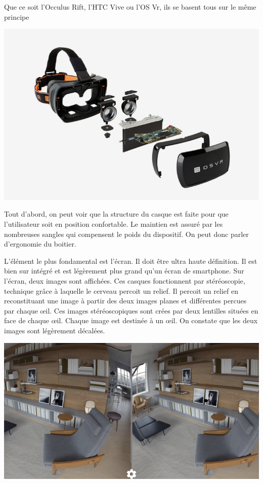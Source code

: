 \documentclass[12pt, a4paper]{report}
\begin{document}
Que ce soit l'Occulus Rift, l'HTC Vive ou l'OS Vr, ils se basent tous sur le même principe
\begin{center}
\includegraphics[scale=0.3]{eclate.jpg}
\end{center}

Tout d'abord, on peut voir que la structure du casque est faite pour que l'utilisateur soit en position confortable. Le maintien est assuré par les nombreuses sangles qui compensent le poids du dispositif. On peut donc parler d'ergonomie du boitier.

L'élément le plus fondamental est l'écran. Il doit être ultra haute définition. Il est bien sur intégré et est légèrement plus grand qu'un écran de smartphone. Sur l'écran, deux images sont affichées. Ces casques fonctionnent par stéréoscopie, technique grâce à laquelle le cerveau percoit un relief. Il percoit un relief en reconstituant une image à partir des deux images planes et différentes percues par chaque \oe{}il. Ces images stéréoscopiques sont crées par deux lentilles situées en face de chaque \oe{}il. Chaque image est destinée à un \oe{}il.
On constate que les deux images sont légèrement décalées.

\begin{center}
\includegraphics[scale=0.5]{ecran.jpg}
\end{center}
\end{document}
